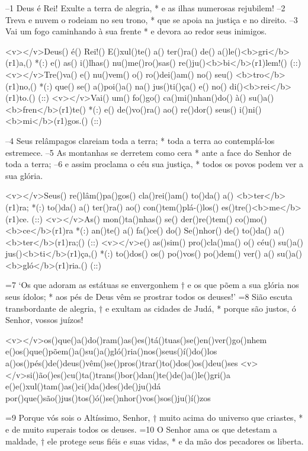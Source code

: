 –1 Deus é Rei! Exulte a terra de alegria, * 
 e as ilhas numerosas rejubilem! 
–2 Treva e nuvem o rodeiam no seu trono, * 
que se apoia na justiça e no direito. 
–3 Vai um fogo caminhando à sua frente * 
e devora ao redor seus inimigos.

<v></v>Deus() é() Rei!() E()xul()te() a() ter()ra() de() a()le()<b>gri</b>(r1)a,() *(:)
e() as() i()lhas() nu()me()ro()sas() re()ju()<b>bi</b>(r1)lem!() (::)
<v></v>Tre()va() e() nu()vem() o() ro()dei()am() no() seu() <b>tro</b>(r1)no,() *(:)
que() se() a()poi()a() na() jus()ti()ça() e() no() di()<b>rei</b>(r1)to.() (::)
<v></v>Vai() um() fo()go() ca()mi()nhan()do() à() su()a() <b>fren</b>(r1)te() *(:)
e() de()vo()ra() ao() re()dor() seus() i()ni()<b>mi</b>(r1)gos.() (::)

–4 Seus relâmpagos clareiam toda a terra; * 
toda a terra ao contemplá-los estremece. 
–5 As montanhas se derretem como cera * 
ante a face do Senhor de toda a terra; 
–6 e assim proclama o céu sua justiça, * 
todos os povos podem ver a sua glória.

<v></v>Seus() re()lâm()pa()gos() cla()rei()am() to()da() a() <b>ter</b>(r1)ra; *(:)
to()da() a() ter()ra() ao() con()tem()plá-()los() es()tre()<b>me</b>(r1)ce. (::)
<v></v>As() mon()ta()nhas() se() der()re()tem() co()mo() <b>ce</b>(r1)ra *(:)
an()te() a() fa()ce() do() Se()nhor() de() to()da() a() <b>ter</b>(r1)ra;() (::)
<v></v>e() as()sim() pro()cla()ma() o() céu() su()a() jus()<b>ti</b>(r1)ça,() *(:)
to()dos() os() po()vos() po()dem() ver() a() su()a() <b>gló</b>(r1)ria.() (::)

=7 ‘Os que adoram as estátuas se envergonhem † 
e os que põem a sua glória nos seus ídolos; * 
aos pés de Deus vêm se prostrar todos os deuses!’ 
=8 Sião escuta transbordante de alegria, † 
e exultam as cidades de Judá, * 
porque são justos, ó Senhor, vossos juízos!

<v></v>os()que()a()do()ram()as()es()tá()tuas()se()en()ver()go()nhem
e()os()que()põem()a()su()a()gló()ria()nos()seus()í()do()los
a()os()pés()de()deus()vêm()se()pros()trar()to()dos()os()deu()ses
<v></v>si()ão()es()cu()ta()trans()bor()dan()te()de()a()le()gri()a
e()e()xul()tam()as()ci()da()des()de()ju()dá
por()que()são()jus()tos()ó()se()nhor()vos()sos()ju()í()zos

=9 Porque vós sois o Altíssimo, Senhor, † 
muito acima do universo que criastes, * 
e de muito superais todos os deuses. 
=10 O Senhor ama os que detestam a maldade, † 
ele protege seus fiéis e suas vidas, * 
e da mão dos pecadores os liberta.

